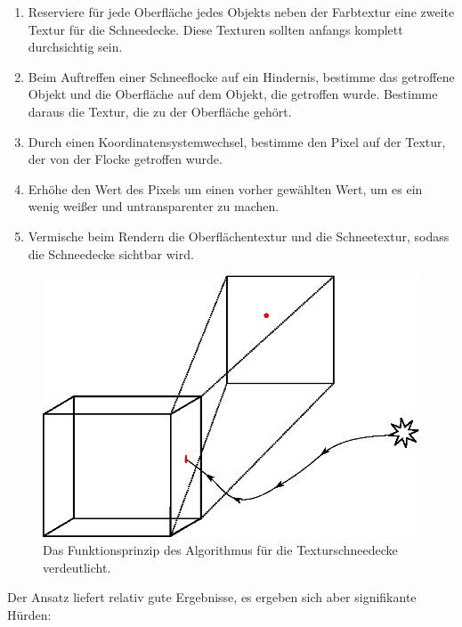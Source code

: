 \begin{enumerate}
\item Reserviere für jede Oberfläche jedes Objekts neben der
Farbtextur eine zweite Textur für die Schneedecke. Diese Texturen sollten
anfangs komplett durchsichtig sein.
\item Beim Auftreffen einer Schneeflocke auf ein Hindernis, bestimme
das getroffene Objekt und die Oberfläche auf dem Objekt, die getroffen
wurde. Bestimme daraus die Textur, die zu der Oberfläche gehört.
\item Durch einen Koordinatensystemwechsel, bestimme den Pixel auf der
Textur, der von der Flocke getroffen wurde.
\item Erhöhe den Wert des Pixels um einen vorher gewählten Wert, um es
ein wenig weißer und untransparenter zu machen.
\item Vermische beim Rendern die Oberflächentextur und die
Schneetextur, sodass die Schneedecke sichtbar wird.
\end{enumerate}

\begin{figure}[h]
\centering
\includegraphics[width=12cm]{images/snow_cover_textures_principle}
\caption{Das Funktionsprinzip des Algorithmus für die Texturschneedecke verdeutlicht.}
\label{fig:implementation_fallen_snow_textures_principle}
\end{figure}

Der Ansatz liefert relativ gute Ergebnisse, es ergeben sich aber
signifikante Hürden:

